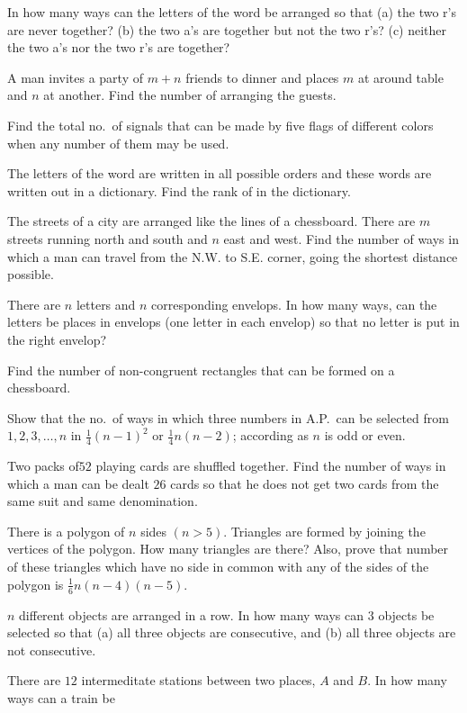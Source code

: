 \item In how many ways can the letters of the word  be arranged so that (a) the two r's are never together? (b) the two
  a's are together but not the two r's? (c) neither the two a's nor the two r's are together?
\item A man invites a party of $m + n$ friends to dinner and places $m$ at around table and $n$ at another. Find the number of
  arranging the guests.
\item Find the total no.\ of signals that can be made by five flags of different colors when any number of them may be used.
\item The letters of the word  are written in all possible orders and these words are written out in a dictionary. Find
  the rank of  in the dictionary.
\item The streets of a city are arranged like the lines of a chessboard. There are $m$ streets running north and south and $n$ east
  and west. Find the number of ways in which a man can travel from the N.W. to S.E. corner, going the shortest distance possible.
\item There are $n$ letters and $n$ corresponding envelops. In how many ways, can the letters be places in envelops (one letter in
  each envelop) so that no letter is put in the right envelop?
\item Find the number of non-congruent rectangles that can be formed on a chessboard.
\item Show that the no.\ of ways in which three numbers in A.P.\ can be selected from $1, 2, 3, \ldots, n$ in $\frac{1}{4}{(n -
  1)}^2$ or $\frac{1}{4}n(n - 2)$; according as $n$ is odd or even.
\item Two packs of$52$ playing cards are shuffled together. Find the number of ways in which a man can be dealt $26$ cards so that
  he does not get two cards from the same suit and same denomination.
\item There is a polygon of $n$ sides $(n > 5)$. Triangles are formed by joining the vertices of the polygon. How many triangles
  are there? Also, prove that number of these triangles which have no side in common with any of the sides of the polygon is
  $\frac{1}{6}n(n - 4)(n - 5)$.
\item $n$ different objects are arranged in a row. In how many ways can $3$ objects be selected so that (a) all three objects are
  consecutive, and (b) all  three objects are not consecutive.
\item There are $12$ intermeditate stations between two places, $A$ and $B$. In how many ways can a train be
